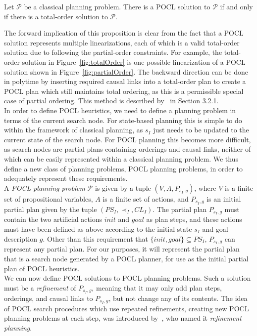 \begin{prop}
    Let $\mathcal{P}$ be a classical planning problem. There is a POCL solution to $\mathcal{P}$ if and only if there is a total-order solution to $\mathcal{P}$.
\end{prop}


The forward implication of this proposition is clear from the fact that a POCL solution represents multiple linearizations, each of which is a valid total-order solution due to following the partial-order constraints. For example, the total-order solution in Figure~\ref{fig:totalOrder} is one possible linearization of a POCL solution shown in Figure~\ref{fig:partialOrder}. The backward direction can be done in polytime by inserting required causal links into a total-order plan to create a POCL plan which still maintains total ordering, as this is a permissible special case of partial ordering. This method is described by~\cite{Muise2016POPRelax} in Section 3.2.1.\\


In order to define POCL heuristics, we need to define a planning problem in terms of the current search node. For state-based planning this is simple to do within the framework of classical planning, as $s_I$ just needs to be updated to the current state of the search node. For POCL planning this becomes more difficult, as search nodes are partial plans containing orderings and causal links, neither of which can be easily represented within a classical planning problem. We thus define a new class of planning problems, POCL planning problems, in order to adequately represent these requirements.\\


A \textit{POCL planning problem} $\mathcal{P}$ is given by a tuple $(V, A, P_{s_I,g})$, where $V$ is a finite set of propositional variables, $A$ is a finite set of actions, and $P_{s_I,g}$ is an initial partial plan given by the tuple $(PS_I, \prec_I, CL_I)$. The partial plan $P_{s_I,g}$ must contain the two artificial actions $\mathit{init}$ and $\mathit{goal}$ as plan steps, and these actions must have been defined as above according to the initial state $s_I$ and goal description $g$. Other than this requirement that $\{init, goal\}\subseteq PS_I$, $P_{s_I,g}$ can represent any partial plan. For our purposes, it will represent the partial plan that is a search node generated by a POCL planner, for use as the initial partial plan of POCL heuristics. \\


We can now define POCL solutions to POCL planning problems. Such a solution must be a \textit{refinement} of $P_{s_I,g}$, meaning that it may only add plan steps, orderings, and causal links to $P_{s_I,g}$, but not change any of its contents. The idea of POCL search procedures which use repeated refinements, creating new POCL planning problems at each step, was introduced by~\cite{Kambhampati1997RefinementPlanning}, who named it \textit{refinement planning}.\\


